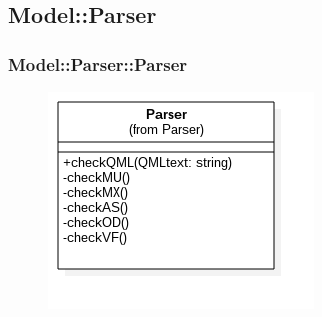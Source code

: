 \subsection{Model::Parser}
\subsubsection{Model::Parser::Parser}
\begin{figure}[h!]
\begin{center}
	\includegraphics[scale=0.6]{../images/Model/Parser/Parser.png}
\end{center}
\end{figure}

